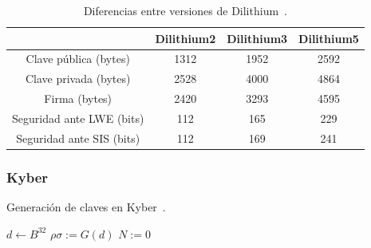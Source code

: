 \begin{table}[H]
    \centering
    \begin{tabular}{|c|c|c|c|}
    \hline
                                & \textbf{Dilithium2}   & \textbf{Dilithium3}   & \textbf{Dilithium5}   \\ \hline
    Clave pública (bytes)       & 1312                  & 1952                  & 2592                  \\ \hline
    Clave privada (bytes)       & 2528                  & 4000                  & 4864                  \\ \hline
    Firma (bytes)               & 2420                  & 3293                  & 4595                  \\ \hline
    Seguridad ante LWE (bits)   & 112                   & 165                   & 229                   \\ \hline
    Seguridad ante SIS (bits)   & 112                   & 169                   & 241                   \\ \hline
    \end{tabular}
    \caption{Diferencias entre versiones de Dilithium~\cite{dilithium_spec}.}
    \label{tab:dilithium}
\end{table}



\subsubsection{Kyber}\label{subsubsec:kyber}


\begin{algorithm}
    \caption{Generación de claves en Kyber~\cite{kyber_spec}.}
    \label{alg:gen_kyber}
    \hspace{2mm}$d \gets B^{32}$\newline
    $\rho\sigma := G(d)$\newline
    $N := 0$\newline
\end{algorithm}


